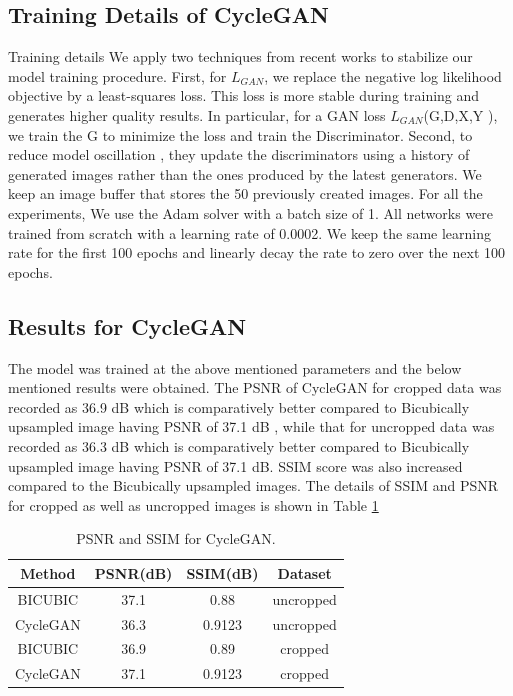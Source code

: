 \subsection{Training Details of CycleGAN}
Training details We apply two techniques from recent works to stabilize our model training procedure. First, for $L_{G A N}$, we replace the negative log likelihood objective by a least-squares loss. This loss is more stable during training and generates higher quality results. In particular, for a GAN loss $L_{G A N}$(G,D,X,Y ), we train the G to minimize the loss and train the Discriminator.
Second, to reduce model oscillation , they update the discriminators using a history of generated images rather than the ones produced by the latest generators. We keep an image buffer that stores the 50 previously created images. For all the experiments, We use the Adam solver \cite{Adam} 
with a batch size of 1. All networks were trained from scratch with a learning rate of 0.0002. We keep the same learning rate for the first 100 epochs and linearly decay the rate to zero over the next 100 epochs.
\subsection{Results for CycleGAN}
The model was trained at the above mentioned parameters and the below mentioned results were obtained. The PSNR of CycleGAN for cropped data was recorded as 36.9 dB which is comparatively better compared to Bicubically upsampled image having PSNR of 37.1 dB , while that for uncropped data was recorded as 36.3 dB which is comparatively better compared to Bicubically upsampled image having PSNR of 37.1 dB. SSIM score was also increased compared to the Bicubically upsampled images.
The details of SSIM and PSNR for cropped as well as uncropped images is shown in Table \ref{Table:5.2}
\begin{table}[H]
\centering
\caption{PSNR and SSIM for CycleGAN.}
\begin{tabular}{ |c|c|c|c| }
\hline
 Method & PSNR(dB) & SSIM(dB) & Dataset \\ 
  \hline
 BICUBIC &	37.1 &	0.88 & uncropped \\
 CycleGAN &	36.3 &	0.9123 & uncropped \\
 BICUBIC &	36.9 &	0.89 & cropped \\
 CycleGAN &	37.1	& 0.9123 & cropped\\
\hline
\end{tabular}
\label{Table:5.2}
\end{table}

